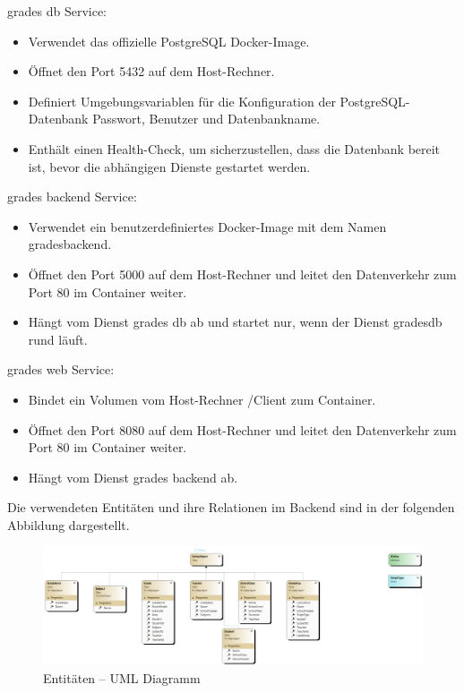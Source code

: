 grades \textunderscore db Service: 
    \begin{itemize}
        \item Verwendet das offizielle PostgreSQL Docker-Image.
        \item Öffnet den Port 5432 auf dem Host-Rechner.
        \item Definiert Umgebungsvariablen für die Konfiguration der PostgreSQL-Datenbank Passwort, Benutzer und Datenbankname.
        \item Enthält einen Health-Check, um sicherzustellen, dass die Datenbank bereit ist, bevor die abhängigen Dienste gestartet werden.
    \end{itemize}
grades \textunderscore backend Service:
    \begin{itemize}
        \item Verwendet ein benutzerdefiniertes Docker-Image mit dem Namen gradesbackend.
        \item Öffnet den Port 5000 auf dem Host-Rechner und leitet den Datenverkehr zum Port 80 im Container weiter.
        \item Hängt vom Dienst grades \textunderscore db ab und startet nur, wenn der Dienst grades\textunderscore db rund läuft.
    \end{itemize}
grades \textunderscore web Service:
    \begin{itemize}
        \item Bindet ein Volumen vom Host-Rechner /Client zum Container.
        \item Öffnet den Port 8080 auf dem Host-Rechner und leitet den Datenverkehr zum Port 80 im Container weiter.
        \item Hängt vom Dienst grades \textunderscore backend ab.
    \end{itemize}

\newpage

Die verwendeten Entitäten und ihre Relationen im Backend sind in der folgenden Abbildung dargestellt.

\begin{figure}[H]
    \centering
    \includegraphics[scale=0.5]{pics/EntitiesClassDiagram.png}
    \caption{Entitäten -- UML Diagramm}
    \label{fig:impl:Entities}
\end{figure}

